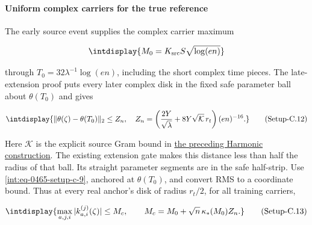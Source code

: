 \paragraph{Uniform complex carriers for the true reference}
\label{int:setup-core-3}
\mbox{}\par\smallskip


The early source event supplies the complex carrier maximum


\begingroup\renewcommand{\theHequation}{intdisplay.933}
\begin{equation*}
\intdisplay{
M_0=K_{\rm src}S\sqrt{\log(en)}
}
\end{equation*}
\endgroup


through \(T_0=32\lambda^{-1}\log(en)\), including the short complex time pieces. The late-extension proof puts every later complex disk in the fixed safe parameter ball about \(\theta(T_0)\) and gives


\label{int:eq-setup-c-12}
\begingroup\renewcommand{\theHequation}{intdisplay.934}
\begin{equation}
\intdisplay{
\|\theta(\zeta)-\theta(T_0)\|_2\le Z_n,
\quad
Z_n=\left(\frac{2Y}{\sqrt\lambda}
       +8Y\sqrt{\mathcal K}\,r_t\right)(en)^{-16}.
}
\tag{Setup-C.12}
\label{int:eq-0468-setup-c-12}
\end{equation}
\endgroup


Here \(\mathcal K\) is the explicit source Gram bound in \hyperref[int:harmonic-construction]{the preceding Harmonic construction}. The existing extension gate makes this distance less than half the radius of that ball. Its straight parameter segments are in the safe half-strip. Use \hyperref[int:eq-setup-c-9]{\eqref{int:eq-0465-setup-c-9}}, anchored at \(\theta(T_0)\), and convert RMS to a coordinate bound. Thus at every real anchor's disk of radius \(r_t/2\), for all training carriers,


\label{int:eq-setup-c-13}
\begingroup\renewcommand{\theHequation}{intdisplay.935}
\begin{equation}
\intdisplay{
\max_{a,j,i}|k_{a,i}^{(j)}(\zeta)|\le M_c,
\qquad M_c=M_0+\sqrt n\,\kappa_*(M_0)Z_n.
}
\tag{Setup-C.13}
\label{int:eq-0469-setup-c-13}
\end{equation}
\endgroup

